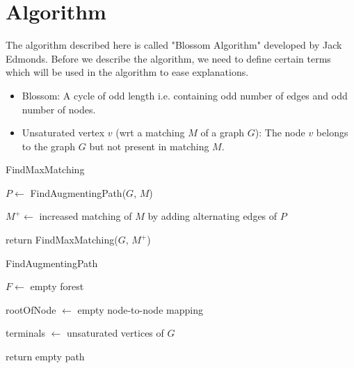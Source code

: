 \documentclass{article}
\begin{document}
\section{Algorithm}
The algorithm described here is called "Blossom Algorithm" developed by Jack Edmonds. Before we describe the algorithm, we need to define certain terms which will be used in the algorithm to ease explanations.

\begin{itemize}
    \item Blossom: A cycle of odd length i.e. containing odd number of edges and odd number of nodes.
    \item Unsaturated vertex $v$ (wrt a matching $M$ of a graph $G$): The node $v$ belongs to the graph $G$ but not present in matching $M$.
\end{itemize}

\begin{algorithm}[!h]
\SetAlgoLined
{}
\caption{FindMaxMatching}

$P \leftarrow$ FindAugmentingPath($G$, $M$)


$M^+ \leftarrow$ increased matching of $M$ by adding alternating edges of $P$

return FindMaxMatching($G$, $M^+$)

\end{algorithm}


\begin{algorithm}[!h]
\caption{FindAugmentingPath}

$F \leftarrow$ empty forest

rootOfNode $\leftarrow$ empty node-to-node mapping

terminals $\leftarrow$ unsaturated vertices of $G$


return empty path
\end{algorithm}
\end{document}
